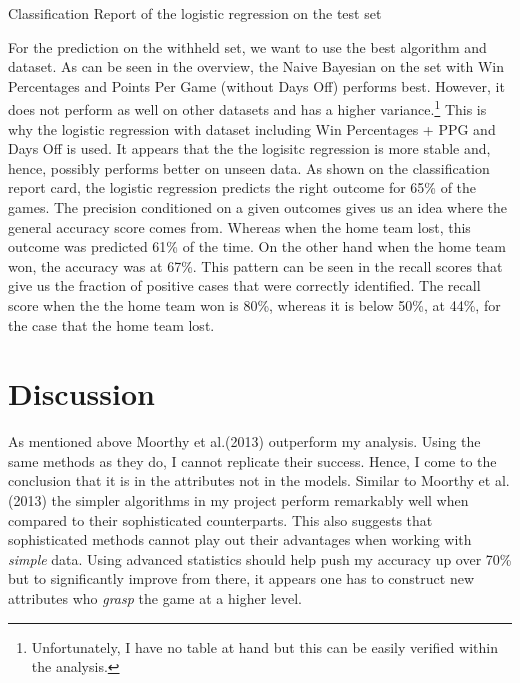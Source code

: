 \documentclass[11pt,a4paper,leqno]{article}
\begin{document}
\begin{table}

\caption{Classification Report of the logistic regression on the test set}
\centering
    

   \end{table}


For the prediction on the withheld set, we want to use the best algorithm and dataset. As can be seen in the overview, the Naive Bayesian on the set with Win Percentages and Points Per Game (without Days Off) performs best. However, it does not perform as well on other datasets and has a higher variance.\footnote{Unfortunately, I have no table at hand but this can be easily verified within the analysis.} This is why the logistic regression with dataset including Win Percentages + PPG and Days Off is used. It appears that the the logisitc regression is more stable and, hence, possibly performs better on unseen data.  As shown on the classification report card, the logistic regression predicts the right outcome for 65\% of the games. The precision conditioned on a given outcomes gives us an idea where the general accuracy score comes from. Whereas when the home team lost, this outcome was predicted 61\% of the time. On the other hand when the home team won, the accuracy was at 67\%. This pattern can be seen in the recall scores that give us the fraction of positive cases that were correctly identified. The recall score when the the home team won is 80\%, whereas it is below 50\%, at 44\%, for the case that the home team lost.

\section{Discussion}

As mentioned above Moorthy et al.(2013) outperform my analysis. Using the same methods as they do, I cannot replicate their success.  Hence, I come to the conclusion that it is in the attributes not in the models. Similar to Moorthy et al.(2013) the simpler algorithms in my project perform remarkably well when compared to their sophisticated counterparts. This also suggests that sophisticated methods cannot play out their advantages when working with \textit{simple} data. Using advanced statistics should help push my accuracy up over 70\% but to significantly improve from there, it appears one has to construct new attributes who \textit{grasp} the game at a higher level.
\end{document}
